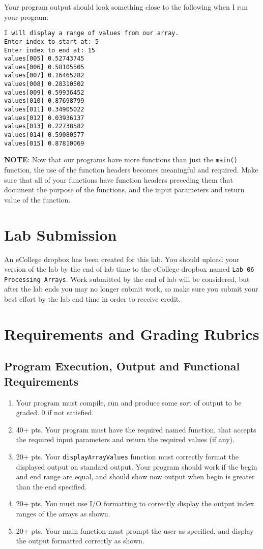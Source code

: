 \documentclass[11pt]{article}
\begin{document}
Your program output should look something close to the following when I
run your program:

\begin{verbatim}
I will display a range of values from our array.
Enter index to start at: 5
Enter index to end at: 15
values[005] 0.52743745
values[006] 0.58105505
values[007] 0.16465282
values[008] 0.28310502
values[009] 0.59936452
values[010] 0.87698799
values[011] 0.34905022
values[012] 0.03936137
values[013] 0.22738582
values[014] 0.59080577
values[015] 0.87810069
\end{verbatim}


\textbf{NOTE}: Now that our programs have more functions than just the
\verb~main()~ function, the use of the function headers becomes meaningful
and required.  Make sure that all of your functions have function
headers preceding them that document the purpose of the functions, and
the input parameters and return value of the function.
\section*{Lab Submission}
\label{sec-3}

An eCollege dropbox has been created for this lab.  You should
upload your version of the lab by the end of lab time to the eCollege
dropbox named \verb~Lab 06 Processing Arrays~.  Work submitted by the end
of lab will be considered, but after the lab ends you may no longer
submit work, so make sure you submit your best effort by the lab end
time in order to receive credit.
\section*{Requirements and Grading Rubrics}
\label{sec-4}

\subsection*{Program Execution, Output and Functional Requirements}
\label{sec-4-1}

\begin{enumerate}
\item Your program must compile, run and produce some sort of output to be
graded. 0 if not satisfied.
\item 40+ pts.  Your program must have the required named function,
that accepts the required input parameters and return the required
values (if any).
\item 20+ pts. Your \verb~displayArrayValues~ function must correctly format
the displayed output on standard output.  Your program should work
if the begin and end range are equal, and should show now output
when begin is greater than the end specified.
\item 20+ pts.  You must use I/O formatting to correctly display the
output index ranges of the arrays as shown.
\item 20+ pts. Your main function must prompt the user as specified, and
display the output formatted correctly as shown.
\end{enumerate}
\end{document}

